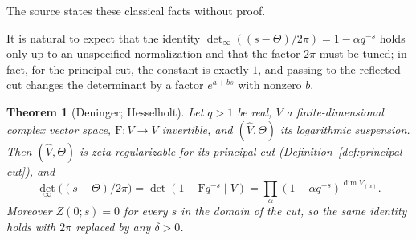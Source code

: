\documentclass[11pt]{amsart}
\theoremstyle{plain}
\newtheorem{theorem}{Theorem}[section]
\theoremstyle{definition}
\theoremstyle{remark}
\numberwithin{equation}{section}
\newcommand{\detreg}{{\det}_{\infty}}
\begin{document}
The source states these classical facts without proof.

It is natural to expect that the identity
$\detreg((s-\Theta)/2\pi)=1-\alpha q^{-s}$ holds only up to an
unspecified normalization and that the factor $2\pi$ must be tuned; in
fact, for the principal cut, the constant is exactly $1$, and passing
to the reflected cut changes the determinant by a factor $e^{a+bs}$
with nonzero $b$.

\begin{theorem}[Deninger; Hesselholt]\label{thm:ff-det}
Let $q>1$ be real, $V$ a finite-dimensional complex vector space,
$\mathrm{F}:V\to V$ invertible, and $(\widehat V,\Theta)$ its
logarithmic suspension. Then $(\widehat V,\Theta)$ is zeta-regularizable
for its principal cut (Definition~\ref{def:principal-cut}), and
\[
\detreg\bigl((s-\Theta)/2\pi\bigr)=\det(1-\mathrm{F}q^{-s}\mid V)
=\prod_\alpha(1-\alpha q^{-s})^{\dim V_{(\alpha)}}.
\]
Moreover $Z(0;s)=0$ for every $s$ in the domain of the cut, so the same
identity holds with $2\pi$ replaced by any $\delta>0$.
\end{theorem}
\end{document}
